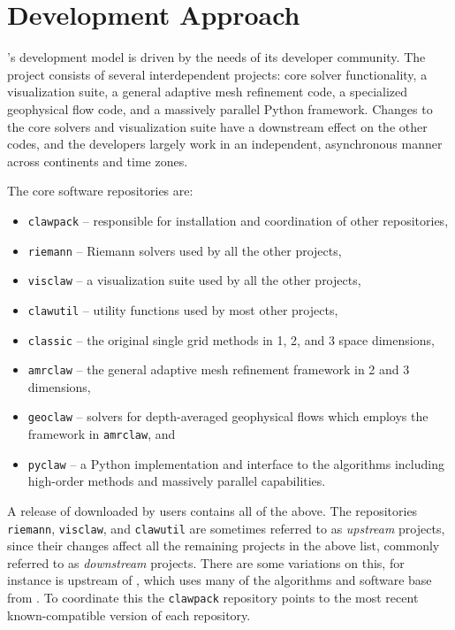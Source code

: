 %
%
%

\section{Development Approach} \label{sec:development}

\clawpack's development model is driven by the needs of its
developer community.  The \clawpack project consists of several
interdependent projects: core solver functionality, a
visualization suite, a general adaptive mesh refinement code, a
specialized geophysical flow code, and a massively parallel Python
framework.  Changes to the core solvers and visualization suite have a
downstream effect on the other codes, and the developers largely work
in an independent, asynchronous manner across continents and time
zones.

\vskip 5pt
The core \clawpack software repositories are:
\begin{itemize}
    \item \texttt{clawpack} -- responsible for installation and coordination of
    other repositories,
    \item \texttt{riemann} -- Riemann solvers used by all the other
    projects,
    \item \texttt{visclaw} -- a visualization suite used by all the other
    projects,
    \item \texttt{clawutil} -- utility functions used by most other
    projects,
    \item \texttt{classic} -- the original single grid methods in 1, 2, and 3
    space dimensions,
    \item \texttt{amrclaw} -- the general adaptive mesh refinement
    framework in 2 and 3 dimensions,
    \item \texttt{geoclaw} -- solvers for depth-averaged
    geophysical flows which employs the framework in \texttt{amrclaw}, and
    \item \texttt{pyclaw} -- a Python implementation and interface to the
    \clawpack algorithms including high-order methods and massively
    parallel capabilities.
\end{itemize}

\noindent
A release of \clawpack downloaded by users contains all of the above.
The repositories \texttt{riemann}, \texttt{visclaw}, and
\texttt{clawutil} are sometimes referred to as \textit{upstream}
projects, since their changes affect all the remaining projects in the
above list, commonly referred to as \textit{downstream} projects.
There are some variations on this, for instance \amrclaw is upstream
of \geoclaw, which uses many of the algorithms and software base from
\amrclaw.  To coordinate this the \texttt{clawpack} repository
points to the most recent known-compatible version of each repository.

